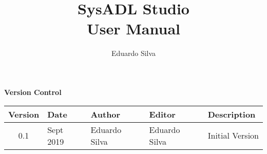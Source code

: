 \documentclass[]{report}
\title{SysADL Studio\\\small{User Manual}}
\author{Eduardo Silva}
\begin{document}
	\maketitle
	
	\begin{table*}
		\centering
		{\huge{\textbf{Version Control}}}\\
		\vspace{15px}
		\begin{tabular}{c | l | l | l | l }
			\hline
			\textbf{Version} & \textbf{Date} & \textbf{Author} & \textbf{Editor} & \textbf{Description} \\ \hline
			0.1 & Sept 2019 & Eduardo Silva & Eduardo Silva & Initial Version \\
			\hline
		\end{tabular}
	\end{table*}
	
	\tableofcontents
	
	
	
	
	
	
	
	
	
	
\end{document}
